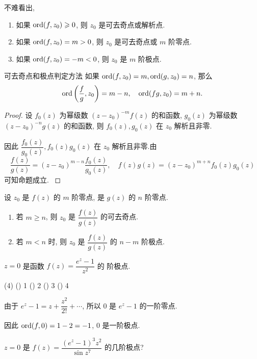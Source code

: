 不难看出,
\begin{enumerate}
	\item 如果 ${\mathrm{ord}}(f,z_0)\geqslant0$, 则 $z_0$ 是可去奇点或解析点.
	\item 如果 ${\mathrm{ord}}(f,z_0)=m>0$, 则 $z_0$ 是可去奇点或 $m$ 阶零点.
	\item 如果 ${\mathrm{ord}}(f,z_0)=-m<0$, 则 $z_0$ 是 $m$ 阶极点.
\end{enumerate}

\begin{second}{可去奇点和极点判定方法}
	如果 ${\mathrm{ord}}(f,z_0)=m,{\mathrm{ord}}(g,z_0)=n$, 那么
	\[{\mathrm{ord}}\left(\frac fg,z_0\right)=m-n,\quad{\mathrm{ord}}(fg,z_0)=m+n.\]
\end{second}

\begin{proof}
		设 $f_0(z)$ 为幂级数 $(z-z_0)^{-m}f(z)$ 的和函数, $g_0(z)$ 为幂级数 $(z-z_0)^{-n}g(z)$ 的和函数,
	{则 $f_0(z),g_0(z)$ 在 $z_0$ 解析且非零.
	}%

	{因此 $\dfrac{f_0(z)}{g_0(z)},f_0(z)g_0(z)$ 在 $z_0$ 解析且非零.由
		\[\frac{f(z)}{g(z)}=(z-z_0)^{m-n}\frac{f_0(z)}{g_0(z)},\quad
		f(z)g(z)=(z-z_0)^{m+n}f_0(z)g_0(z)\]
		可知命题成立.\qedhere
	}
\end{proof}

\begin{corollary}
	设 $z_0$ 是 $f(z)$ 的 $m$ 阶零点, 是 $g(z)$ 的 $n$ 阶零点.
	\begin{enumerate}
		\item 若 $m\ge n$, 则 $z_0$ 是 $\dfrac{f(z)}{g(z)}$ 的可去奇点.
		\item 若 $m<n$ 时, 则 $z_0$ 是 $\dfrac{f(z)}{g(z)}$ 的 $n-m$ 阶极点.
	\end{enumerate}
\end{corollary}

\begin{example}
	$z=0$ 是函数 $f(z)=\dfrac{e^z-1}{z^2}$ 的 阶极点.
	\begin{taskschoice}(4)
		() 1
		() 2
		() 3
		() 4
	\end{taskschoice}
\end{example}

\begin{solution}
		由于 $e^z-1=z+\dfrac{z^2}{2!}+\cdots$, 所以 $0$ 是 $e^z-1$ 的一阶零点.

	{因此 ${\mathrm{ord}}(f,0)=1-2=-1$, $0$ 是一阶极点.
	}
\end{solution}

\begin{example}
	$z=0$ 是 $f(z)=\dfrac{(e^z-1)^3z^2}{\sin z^7}$ 的几阶极点?
\end{example}

